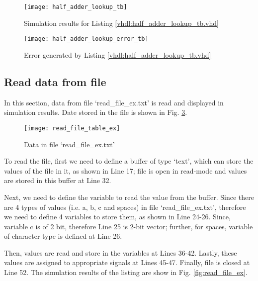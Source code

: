 

\begin{figure}[!h]
	\centering
	\texttt{[image: half\_adder\_lookup\_tb]}
	\caption{Simulation results for Listing \ref{vhdl:half_adder_lookup_tb.vhd}}
	\label{fig:half_adder_lookup_tb}
\end{figure}

\begin{figure}[!h]
	\centering
	\texttt{[image: half\_adder\_lookup\_error\_tb]}
	\caption{Error generated by Listing \ref{vhdl:half_adder_lookup_tb.vhd}}
	\label{fig:half_adder_lookup_error_tb}
\end{figure}

\subsection{Read data from file} \label{sec_read_data_from_file}

In this section, data from file `read\_file\_ex.txt' is read and displayed in simulation results. Date stored in the file is shown in Fig. \ref{fig:read_file_table_ex}. 

\begin{figure}[!h]
	\centering
	\texttt{[image: read\_file\_table\_ex]}
	\caption{Data in file  `read\_file\_ex.txt'}
	\label{fig:read_file_table_ex}
\end{figure}

\begin{explanation}
	To read the file, first we need to define a buffer of type `text', which can store the values of the file in it, as shown in Line 17; file is open in read-mode and values are stored in this buffer at Line 32.  
	
	Next, we need to define the variable to read the value from the buffer. Since there are 4 types of values (i.e. a, b, c and spaces) in file `read\_file\_ex.txt', therefore we need to define 4 variables to store them, as shown in Line 24-26. Since, variable c is of 2 bit, therefore Line 25 is 2-bit vector; further, for spaces, variable of character type is defined at Line 26. 
	
	Then, values are read and store in the variables at Lines 36-42. Lastly, these values are assigned to appropriate signals at Lines 45-47. Finally, file is closed at Line 52. The simulation results of the listing are show in Fig. \ref{fig:read_file_ex}. 
\end{explanation}


